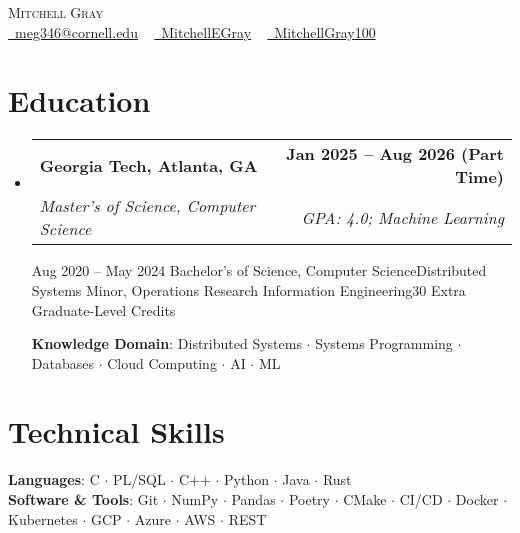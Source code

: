 \documentclass[letterpaper,11pt]{article}
\makeatletter
\newcommand{\resumeSpecialSubheadingCornell}[6]{
  \vspace{-2pt}\item
    \begin{tabular*}{1.0\textwidth}[t]{l@{\extracolsep{\fill}}r}
      \textbf{#1} & \textbf{\small #2} \\
      \textit{\small#3} & \textit{\small #4} \\
      \textit{\small#5} & \textit{\small #6} \\
    \end{tabular*}\vspace{-7pt}
}
\newcommand{\resumeSpecialSubheadingGT}[6]{
  \vspace{-2pt}\item
    \begin{tabular*}{1.0\textwidth}[t]{l@{\extracolsep{\fill}}r}
      \textbf{#1} & \textbf{\small #2} \\
      \textit{\small#3} & \textit{\small #4} \\
    \end{tabular*}\vspace{-7pt}
}
\newcommand{\resumeSubHeadingListStart}{\begin{itemize}[leftmargin=0.0in, label={}]}
\newcommand{\resumeSubHeadingListEnd}{\end{itemize}}
\makeatother
\begin{document}
\begin{center}
    {\Huge \scshape Mitchell Gray} \\ \vspace{1pt}
    \small
    \href{mailto:meg346@cornell.edu}{\faEnvelope\ meg346@cornell.edu} ~ 
    \href{https://www.linkedin.com/in/mitchellegray/}{\faLinkedin\ MitchellEGray}  ~
    \href{https://github.com/MitchellGray100}{\faGithub\ MitchellGray100}
    \vspace{-8pt}
\end{center}


\section{\textcolor{customred}{Education}}
  \resumeSubHeadingListStart
    \resumeSpecialSubheadingGT
      {Georgia Tech, Atlanta, GA}{Jan 2025 -- Aug 2026 (Part Time)}
      {Master's of Science, Computer Science}{GPA: 4.0; Machine Learning}%


    \resumeSpecialSubheadingCornell
      {Cornell University, Ithaca, NY}{Aug 2020 -- May 2024}
      {Bachelor's of Science, Computer Science}{Distributed Systems}%
      {Minor, Operations Research Information Engineering}{30 Extra Graduate-Level Credits}

      \vspace{2pt}
      \textbf{Knowledge Domain}: Distributed Systems $\cdot$ Systems Programming $\cdot$ Databases $\cdot$ Cloud Computing 
      $\cdot$ AI $\cdot$ ML
      
    \resumeSubHeadingListEnd
\vspace{-18pt}

\section{\textcolor{customred}{Technical Skills}}
 \begin{itemize}[leftmargin=0.1in, label={}]
    \small{\item{
     \textbf{Languages}{: C $\cdot$ PL/SQL $\cdot$ C++ $\cdot$ Python $\cdot$ Java $\cdot$ Rust} \\
     \textbf{Software \& Tools}{: 
     Git $\cdot$ NumPy $\cdot$ Pandas $\cdot$ Poetry $\cdot$ CMake $\cdot$ CI/CD $\cdot$ Docker $\cdot$ Kubernetes $\cdot$ GCP $\cdot$ Azure $\cdot$ AWS $\cdot$ REST
     }\\
    }}
 \end{itemize}
 \vspace{-20pt}
\end{document}
